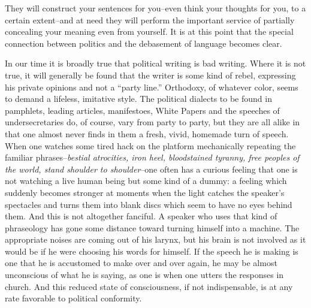 \documentclass[a4paper]{article}
\begin{document}
They will construct your sentences for you--even think your thoughts for you, to a certain extent--and at need they will perform the important service of partially concealing your meaning even from yourself. It is at this point that the special connection between politics and the debasement of language becomes clear.

In our time it is broadly true that political writing is bad writing. Where it is not true, it will generally be found that the writer is some kind of rebel, expressing his private opinions and not a ``party line.'' Orthodoxy, of whatever color, seems to demand a lifeless, imitative style. The political dialects to be found in pamphlets, leading articles, manifestoes, White Papers and the speeches of undersecretaries do, of course, vary from party to party, but they are all alike in that one almost never finds in them a fresh, vivid, homemade turn of speech. When one watches some tired hack on the platform mechanically repeating the familiar phrases--\textit{bestial atrocities, iron heel, bloodstained tyranny, free peoples of the world, stand shoulder to shoulder}--one often has a curious feeling that one is not watching a live human being but some kind of a dummy: a feeling which suddenly becomes stronger at moments when the light catches the speaker's spectacles and turns them into blank discs which seem to have no eyes behind them. And this is not altogether fanciful. A speaker who uses that kind of phraseology has gone some distance toward turning himself into a machine. The appropriate noises are coming out of his larynx, but his brain is not involved as it would be if he were choosing his words for himself. If the speech he is making is one that he is accustomed to make over and over again, he may be almost unconscious of what he is saying, as one is when one utters the responses in church. And this reduced state of consciousness, if not indispensable, is at any rate favorable to political conformity. 
\end{document}
